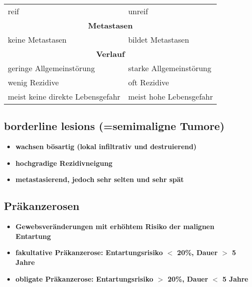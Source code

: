 \begin{itemize}
\begin{center}
\begin{tabular}{|ll|}
						reif & unreif \\
						\multicolumn{2}{|c|}{\textbf{Metastasen}} \\
						keine Metastasen & bildet Metastasen \\
						\multicolumn{2}{|c|}{\textbf{Verlauf}} \\
						geringe Allgemeinstörung & starke Allgemeinstörung \\
						wenig Rezidive & oft Rezidive \\
						meist keine direkte Lebensgefahr & meist hohe Lebensgefahr\\
						\hline
					\end{tabular}
				\end{center}
		\end{itemize}
	\subsection{borderline lesions (=semimaligne Tumore)}
		\begin{itemize}
			\item \textbf{wachsen bösartig (lokal infiltrativ und destruierend)}
			\item \textbf{hochgradige Rezidivneigung}
			\item \textbf{metastasierend, jedoch sehr selten und sehr spät}
		\end{itemize}
	\subsection{Präkanzerosen}
		\begin{itemize}
			\item \textbf{Gewebsveränderungen mit erhöhtem Risiko der malignen Entartung}
			\item \textbf{fakultative Präkanzerose: Entartungsrisiko $<$ 20\%, Dauer $>$ 5 Jahre}
			\item \textbf{obligate Präkanzerose: Entartungsrisiko $>$ 20\%, Dauer $<$ 5 Jahre}
		\end{itemize}
